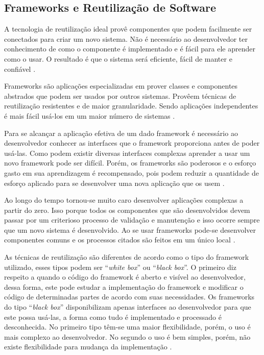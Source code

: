 \subsection{Frameworks e Reutilização de Software}

A tecnologia de reutilização ideal provê componentes que podem facilmente ser conectados para criar um novo sistema. Não é necessário ao desenvolvedor ter conhecimento de como o componente é implementado e é fácil para ele aprender como o usar. O resultado é que o sistema será eficiente, fácil de manter e confiável \cite{Johnson:1997}.

Frameworks são aplicações especializadas em prover classes e componentes abstrados que podem ser usados por outros sistemas. Provêem técnicas de reutilização resistentes e de maior granularidade. Sendo aplicações independentes é mais fácil usá-los em um maior número de sistemas \cite{Johnson:Foote:1988}.

Para se alcançar a aplicação efetiva de um dado framework é necessário ao desenvolvedor conhecer as interfaces que o framework proporciona antes de poder usá-las. Como podem existir diversas interfaces complexas aprender a usar um novo framework pode ser difícil. Porém, os frameworks são poderosos e o esforço gasto em sua aprendizagem é recompensado, pois podem reduzir a quantidade de esforço aplicado para se desenvolver uma nova aplicação que os usem \cite{Johnson:1997}.

Ao longo do tempo tornou-se muito caro desenvolver aplicações complexas a partir do zero. Isso porque todos os componentes que são desenvolvidos devem passar por um criterioso processo de validação e manutenção e isso ocorre sempre que um novo sistema é desenvolvido. Ao se usar frameworks pode-se desenvolver componentes comuns e os processos citados são feitos em um único local \cite{Fayad:Schimidt:1997}.

As técnicas de reutilização são diferentes de acordo como o tipo do framework utilizado, esses tipos podem ser ``\textit{white box}'' ou ``\textit{black box}''. O primeiro diz respeito a quando o código do framework é aberto e visível ao desenvolvedor, dessa forma, este pode estudar a implementação do framework e modificar o código de determinadas partes de acordo com suas necessidades. Os frameworks do tipo ``\textit{black box}'' disponibilizam apenas interfaces ao desenvolvedor para que este possa usá-las, a forma como tudo é implementado e processado é desconhecida. No primeiro tipo têm-se uma maior flexibilidade, porém, o uso é mais complexo ao desenvolvedor. No segundo o uso é bem simples, porém, não existe flexibilidade para mudança da implementação \cite{Kroth:2000}.

